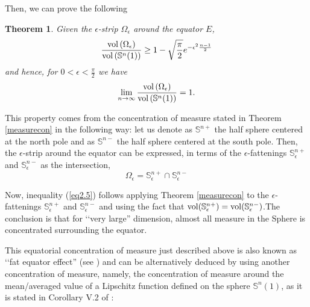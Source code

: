\documentclass{amsart}
\newtheorem{theoremA}{Theorem}
\theoremstyle{definition}
\theoremstyle{remark}
\newcommand{\ese}{\mathbb{S}}
\begin{document}
Then, we can prove the following
\begin{theoremA}\label{equator}
Given the $\epsilon$-strip $\Omega_\epsilon$ around the equator $E$, 
\begin{equation}\label{eq2.5}
\frac{{\rm vol}\left(\Omega_\epsilon\right)}{{\rm vol}\left(\mathbb{S}^n(1)\right)}\geq 1-\sqrt{\frac{\pi}{2}}e^{-\epsilon^2\frac{n-1}{2}}
\end{equation}
 and hence, for $0<\epsilon<\frac{\pi}{2}$ we have
\begin{equation}\label{eq2.5.1}
\lim_{n\to \infty}\frac{{\rm vol}\left(\Omega_\epsilon\right)}{{\rm vol}\left(\mathbb{S}^n(1)\right)}=1.
\end{equation}
\end{theoremA}

This property comes from the concentration of measure stated in Theorem \ref{measurecon} in the following way: let us denote as $\mathbb{S}^{n+}$ the half sphere centered at the north pole and  as $\mathbb{S}^{n-}$ the half sphere centered at the south pole. Then, the $\epsilon$-strip around the equator can be expressed, in terms of the $\epsilon$-fattenings $\mathbb{S}^{n+}_{\epsilon}$ and $\mathbb{S}^{n-}_{\epsilon}$ as the intersection, 
$$\Omega_\epsilon=\mathbb{S}^{n+}_{\epsilon} \cap\mathbb{S}^{n-}_{\epsilon} $$


\noindent Now, inequality (\ref{eq2.5}) follows applying Theorem \ref{measurecon} to the $\epsilon$-fattenings $\mathbb{S}^{n+}_{\epsilon}$ and $\mathbb{S}^{n-}_{\epsilon}$ and using the fact that ${\rm vol}(\mathbb{S}^{n+}_\epsilon)={\rm vol}(\mathbb{S}^{n-}_\epsilon)$.The conclusion is that for  \lq\lq very large'' dimension,  almost all measure in the Sphere is concentrated surrounding  the equator. 

This equatorial concentration of measure just described above is also known as \lq\lq fat equator effect'' (see \cite{Bengtsson}) 
and can be alternatively deduced by using another concentration of measure, namely, the concentration of measure around the mean/averaged value of a Lipschitz function defined on the sphere $\ese^n(1)$, as it is stated in Corollary V.2 of \cite{MS}:
\end{document}
